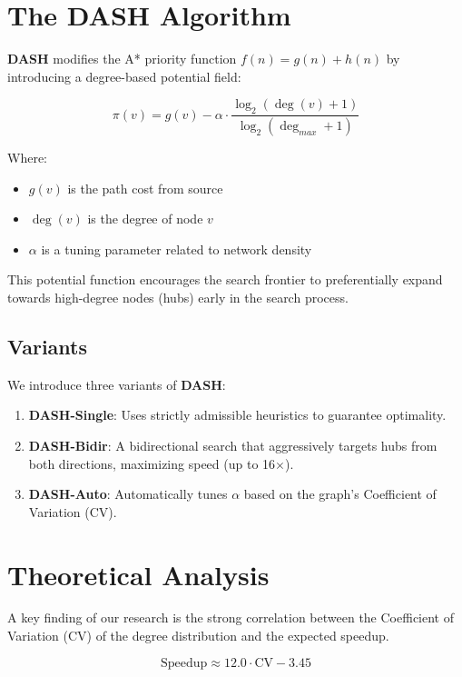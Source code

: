 \documentclass[10pt,twocolumn,letterpaper]{article}
\newcommand{\dash}{\textbf{DASH}}
\begin{document}
\section{The DASH Algorithm}

\dash{} modifies the A* priority function $f(n) = g(n) + h(n)$ by introducing a degree-based potential field:

\begin{equation}
\pi(v) = g(v) - \alpha \cdot \frac{\log_2(\deg(v)+1)}{\log_2(\deg_{max}+1)}
\end{equation}

Where:
\begin{itemize}
    \item $g(v)$ is the path cost from source
    \item $\deg(v)$ is the degree of node $v$
    \item $\alpha$ is a tuning parameter related to network density
\end{itemize}

This potential function encourages the search frontier to preferentially expand towards high-degree nodes (hubs) early in the search process.

\subsection{Variants}

We introduce three variants of \dash{}:

\begin{enumerate}
    \item \textbf{\dash-Single}: Uses strictly admissible heuristics to guarantee optimality.
    \item \textbf{\dash-Bidir}: A bidirectional search that aggressively targets hubs from both directions, maximizing speed (up to 16$\times$).
    \item \textbf{\dash-Auto}: Automatically tunes $\alpha$ based on the graph's Coefficient of Variation (CV).
\end{enumerate}

\section{Theoretical Analysis}

A key finding of our research is the strong correlation between the Coefficient of Variation (CV) of the degree distribution and the expected speedup.

\begin{equation}
\text{Speedup} \approx 12.0 \cdot \text{CV} - 3.45
\end{equation}
\end{document}
